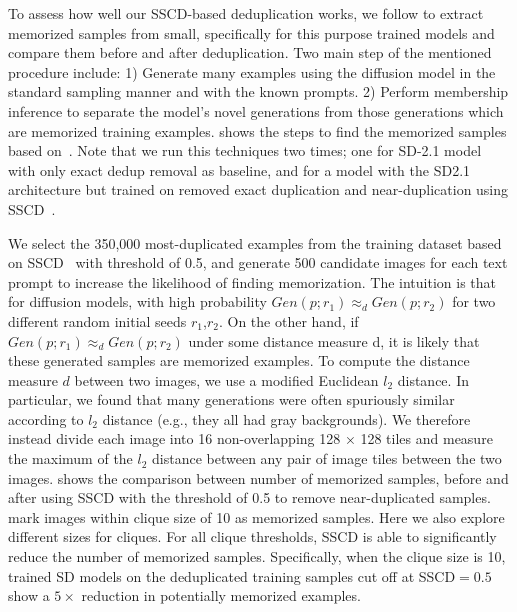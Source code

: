 %
To assess how well our SSCD-based deduplication works, we follow \citet{carlini2023extracting} to extract memorized samples from small, specifically for this purpose trained models and compare them before and after deduplication. Two main step of the mentioned procedure include: 1) Generate many examples using the diffusion model in the standard sampling manner and with the known prompts. 2) Perform membership inference to separate the model’s novel generations from those generations which are memorized training examples.  shows the steps to find the memorized samples based on~\citet{carlini2023extracting}. Note that we run this techniques two times; one for SD-2.1 model with only exact dedup removal as baseline, and for a model with the SD2.1 architecture but trained on removed exact duplication and near-duplication using SSCD~\citep{pizzi2022self}. 

We select the 350,000 most-duplicated examples from the training dataset based on SSCD~\citep{pizzi2022self} with threshold of 0.5, and generate 500 candidate images for each text prompt to increase the likelihood of finding memorization. The intuition is that for diffusion models, with high probability $Gen(p;r_1) \approx _d Gen(p;r_2)$ for two different random initial seeds $r_1$,$r_2$. On the other hand, if $Gen(p;r_1)\approx _d Gen(p;r_2)$ under some distance measure d, it is likely that these generated samples are memorized examples. To compute the distance measure $d$ between two images, we use a modified Euclidean $l_2$ distance. In particular, we found that many generations were often spuriously similar according to  $l_2$ distance (e.g., they all had gray backgrounds). We therefore instead divide each image into 16 non-overlapping 128 × 128 tiles and measure the maximum of the $l_2$ distance between any pair of image tiles between the two images. 
%
 shows the comparison between number of memorized samples, before and after using SSCD with the threshold of 0.5 to remove near-duplicated samples. \citet{carlini2023extracting} mark images within clique size of 10 as memorized samples. Here we also explore different sizes for cliques. For all clique thresholds, SSCD is able to significantly reduce the number of memorized samples. Specifically, when the clique size is 10, trained SD models on the deduplicated training samples cut
off at SSCD$=0.5$ show a $5\times$ reduction in potentially memorized examples.

%
%

%

%

%
%


\algclusterdeduplication
%
%
\figdupcombined
\algmemorizationdetection
\figmembaselinessd
%
%
